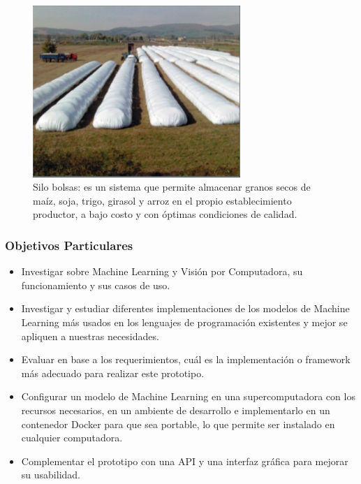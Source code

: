     \begin{figure}
        \centering
        \includegraphics[width=0.7\textwidth]{img/silobolsa.png}
        \caption{Silo bolsas: es un sistema que permite almacenar granos secos de maíz, soja, trigo, girasol y arroz en el propio establecimiento productor, a bajo costo y con óptimas condiciones de calidad.}
        \label{fig:silobolsa}
    \end{figure}

\subsubsection{Objetivos Particulares}
\begin{itemize}
    \item Investigar sobre Machine Learning y Visión por Computadora, su funcionamiento y sus casos de uso.
    \item Investigar y estudiar diferentes implementaciones de los modelos de Machine Learning más usados en los lenguajes de programación existentes y mejor se apliquen a nuestras necesidades.
    \item Evaluar en base a los requerimientos, cuál es la implementación o framework más adecuado para realizar este prototipo.
    \item Configurar un modelo de Machine Learning en una supercomputadora con los recursos necesarios, en un ambiente de desarrollo e implementarlo en un contenedor Docker \cite{docker} para que sea portable, lo que permite ser instalado en cualquier computadora.
    \item Complementar el prototipo con una API \cite{api} y una interfaz gráfica para mejorar su usabilidad.
\end{itemize}


